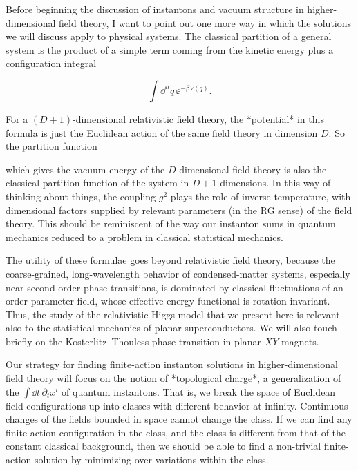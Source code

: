 Before beginning the discussion of instantons and vacuum structure in
higher-dimensional field theory, I want to point out one more way in which the
solutions we will discuss apply to physical systems. The classical partition of
a general system is the product of a simple term coming from the kinetic energy
plus a configuration integral

\[
  \int\dd^n q\,\ee^{-\beta V(q)}.
\]

For a $(D+1)$-dimensional relativistic field theory, the *potential* in this
formula is just the Euclidean action of the same field theory in dimension $D$.
So the partition function

which gives the vacuum energy of the $D$-dimensional field theory is also the
classical partition function of the system in $D+1$ dimensions. In this way of
thinking about things, the coupling $g^2$ plays the role of inverse temperature,
with dimensional factors supplied by relevant parameters (in the RG sense) of
the field theory. This should be reminiscent of the way our instanton sums in
quantum mechanics reduced to a problem in classical statistical mechanics.

The utility of these formulae goes beyond relativistic field theory, because the
coarse-grained, long-wavelength behavior of condensed-matter systems, especially
near second-order phase transitions, is dominated by classical fluctuations of
an order parameter field, whose effective energy functional is rotation-invariant.
Thus, the study of the relativistic Higgs model that we present here is relevant
also to the statistical mechanics of planar superconductors. We will also touch
briefly on the Kosterlitz--Thouless phase transition in planar $XY$ magnets.

Our strategy for finding finite-action instanton solutions in higher-dimensional
field theory will focus on the notion of *topological charge*, a generalization
of the $\int\dd t\,\partial_t x^i$ of quantum instantons. That is, we break the
space of Euclidean field configurations up into classes with different behavior
at infinity. Continuous changes of the fields bounded in space cannot change the
class. If we can find any finite-action configuration in the class, and the class
is different from that of the constant classical background, then we should be
able to find a non-trivial finite-action solution by minimizing over variations
within the class.


